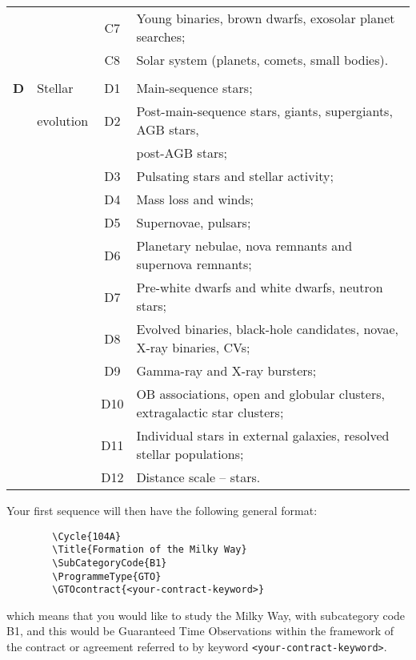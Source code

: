 \documentclass{article}
\begin{document}
\begin{table}[p]
{\begin{center}
\begin{tabular}{llcl}
       &      & C7 & Young binaries, brown dwarfs, exosolar planet searches;\\ 
       &      & C8 & Solar system (planets, comets, small bodies). \\[4pt]  
\hline
& & & \\[-6pt]
{\bf D}& Stellar   & D1 & Main-sequence stars; \\
       & evolution & D2 & Post-main-sequence stars, giants, supergiants, AGB stars, \\
       &           &    & post-AGB stars; \\
       &           & D3 & Pulsating stars and stellar activity; \\
       &           & D4 & Mass loss and winds; \\
       &           & D5 & Supernovae, pulsars; \\
       &           & D6 & Planetary nebulae, nova remnants and supernova remnants; \\
       &           & D7 & Pre-white dwarfs and white dwarfs, neutron stars; \\ 
       &           & D8 & Evolved binaries, black-hole candidates, novae, X-ray binaries, CVs; \\
       &           & D9 & Gamma-ray and X-ray bursters; \\
       &           & D10& OB associations, open and globular clusters, extragalactic star clusters; \\
       &           & D11& Individual stars in external galaxies, resolved stellar populations;\\
       &           & D12& Distance scale -- stars.\\[4pt]
\hline
\end{tabular}
\end{center}
}
\end{table}

Your first sequence will then have the following general format:
\begin{verbatim}
        \Cycle{104A}
        \Title{Formation of the Milky Way}
        \SubCategoryCode{B1}
        \ProgrammeType{GTO}
        \GTOcontract{<your-contract-keyword>}
\end{verbatim}
\noindent which means that you would like to study the Milky Way, with subcategory code B1, and this would be Guaranteed Time
Observations within the framework of the contract or agreement
referred to by keyword \verb|<your-contract-keyword>|.
\end{document}
